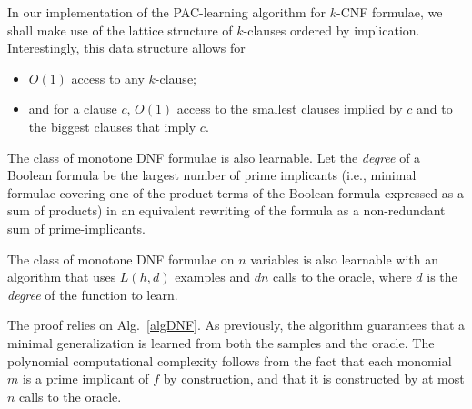 \documentclass{llncs}
\begin{document}
In our implementation of the PAC-learning algorithm for $k$-CNF formulae,
we shall make use of the lattice structure of $k$-clauses ordered by implication.
Interestingly, this data structure allows for
\begin{itemize}
	\item $O(1)$ access to any $k$-clause;
	\item and for a clause $c$, $O(1)$ access to the smallest clauses implied by $c$ and to the biggest clauses that imply $c$.
\end{itemize}

The class of monotone DNF formulae is also learnable. Let the \emph{degree} of
a Boolean formula be the largest number of prime implicants (i.e., minimal
formulae covering one of the product-terms of the Boolean formula expressed as
a sum of products) in an equivalent rewriting of the formula as a
non-redundant sum of prime-implicants.


\begin{theorem}\label{thm:mdnf}
    The class of monotone DNF formulae on $n$ variables is also learnable with an
    algorithm that uses $L(h,d)$ examples and $d n$ calls to the oracle,
    where $d$ is the \emph{degree} of the function to learn.
\end{theorem}

The proof relies on Alg.~\ref{algDNF}. As previously, the algorithm guarantees that a minimal generalization is learned from both the samples and the oracle.
The polynomial computational complexity follows from the fact that each monomial $m$ is a prime implicant
of $f$ by construction, and that it is constructed by at most $n$ calls to the
oracle.
\end{document}
